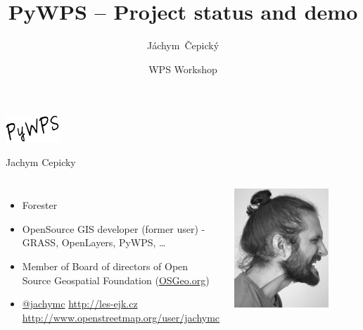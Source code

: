 \documentclass[xcolor=dvipsnames]{beamer}
\title{PyWPS -- Project status and demo}
\subtitle {}
\author[J. Čepický] %
{Jáchym~Čepický\inst{1}}
\institute %
{
  \inst{1}%
  Geosense s.r.o.
  \url{http://geosense.cz}\\
}
\date[] %
{WPS Workshop}
\begin{document}

\begin{frame}
  \titlepage
  \begin{center}
    \includegraphics[width=2cm]{images/pywps.png}
  \end{center}
\end{frame}


\begin{frame}{Jachym Cepicky}
  \begin{columns}
    \begin{itemize} 
        \item Forester
        \item OpenSource GIS developer (former user) - GRASS, OpenLayers, PyWPS, \dots
        \item Member of Board of directors of Open Source Geospatial Foundation (\href{http://osgeo.org}{OSGeo.org})
        \item \href{http://twitter.com/jachymc}{@jachymc}
            \href{http://les-ejk.cz}{http://les-ejk.cz}
            \href{http://www.openstreetmap.org/user/jachymc}{http://www.openstreetmap.org/user/jachymc}
    \end{itemize}
    \includegraphics[width=0.75\textwidth]{images/profil2.jpg}
\end{columns}
\end{frame}
\end{document}
